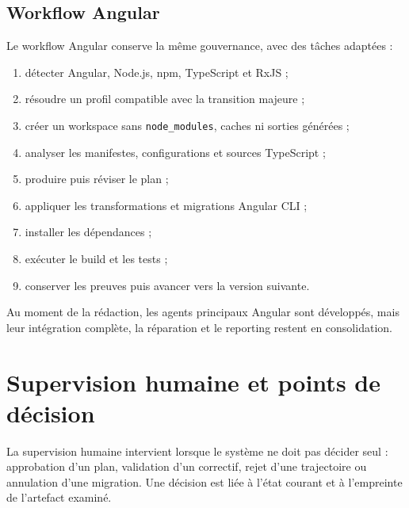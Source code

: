 \subsection{Workflow Angular}

Le workflow Angular conserve la même gouvernance, avec des tâches adaptées :

\begin{enumerate}
    \item détecter Angular, Node.js, npm, TypeScript et RxJS ;
    \item résoudre un profil compatible avec la transition majeure ;
    \item créer un workspace sans \texttt{node\_modules}, caches ni sorties générées ;
    \item analyser les manifestes, configurations et sources TypeScript ;
    \item produire puis réviser le plan ;
    \item appliquer les transformations et migrations Angular CLI ;
    \item installer les dépendances ;
    \item exécuter le build et les tests ;
    \item conserver les preuves puis avancer vers la version suivante.
\end{enumerate}

Au moment de la rédaction, les agents principaux Angular sont développés, mais leur intégration complète, la réparation et le reporting restent en consolidation.

\section{Supervision humaine et points de décision}

La supervision humaine intervient lorsque le système ne doit pas décider seul : approbation d'un plan, validation d'un correctif, rejet d'une trajectoire ou annulation d'une migration. Une décision est liée à l'état courant et à l'empreinte de l'artefact examiné.

